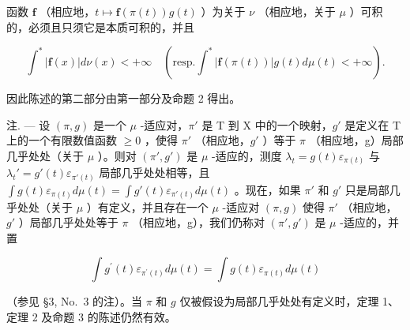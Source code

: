 函数 \(\mathbf{f}\) （相应地，\(t\mapsto \mathbf{f}(\pi (t))g(t)\) ）为关于 \(\nu\) （相应地，关于 \(\mu\) ）可积的，必须且只须它是本质可积的，并且

\[
\int^ {*} | \mathbf {f} (x) | d \nu (x) <   + \infty \quad (\mathrm{resp.} \int^ {*} | \mathbf {f} (\pi (t)) | g (t) d \mu (t) <   + \infty).
\]

因此陈述的第二部分由第一部分及命题 2 得出。

注. --- 设 \((\pi, g)\) 是一个 \(\mu\) -适应对，\(\pi'\) 是 T 到 X 中的一个映射，\(g'\) 是定义在 T 上的一个有限数值函数 \(\geqslant 0\) ，使得 \(\pi'\) （相应地，\(g'\) ）等于 \(\pi\) （相应地，g）局部几乎处处（关于 \(\mu\) ）。则对 \((\pi', g')\) 是 \(\mu\) -适应的，测度 \(\lambda_t = g(t)\varepsilon_{\pi(t)}\) 与 \(\lambda_t' = g'(t)\varepsilon_{\pi'(t)}\) 局部几乎处处相等，且 \(\int g(t)\varepsilon_{\pi(t)} d\mu(t) = \int g'(t)\varepsilon_{\pi'(t)} d\mu(t)\) 。现在，如果 \(\pi'\) 和 \(g'\) 只是局部几乎处处（关于 \(\mu\) ）有定义，并且存在一个 \(\mu\) -适应对 \((\pi, g)\) 使得 \(\pi'\) （相应地，\(g'\) ）局部几乎处处等于 \(\pi\) （相应地，g），我们仍称对 \((\pi', g')\) 是 \(\mu\) -适应的，并置

\[
\int g ^ {\prime} (t) \varepsilon_ {\pi^ {\prime} (t)} d \mu (t) = \int g (t) \varepsilon_ {\pi (t)} d \mu (t)
\]

（参见 §3, No.~3 的注）。当 \(\pi\) 和 \(g\) 仅被假设为局部几乎处处有定义时，定理 1、定理 2 及命题 3 的陈述仍然有效。

